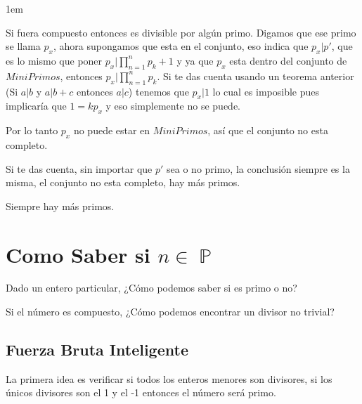 \documentclass[12pt]{report}                                    %
\newenvironment{SmallIndentation}[1][0.75em]                    %
    {\begin{adjustwidth}{#1}{}\begin{footnotesize}}                 %
    {\end{footnotesize}\end{adjustwidth}}                           %
\DeclareMathOperator \Naturals  {\mathbb{N}}                     %
\DeclareMathOperator \Primes    {\mathbb{P}}                     %
\begin{document}
\begin{itemize}
\begin{SmallIndentation}[1em]
                    Si fuera compuesto entonces es divisible por algún primo.
                    Digamos que ese primo se llama $p_x$, ahora supongamos que 
                    esta en el conjunto, eso indica que $p_x|p'$, que es lo
                    mismo que poner $p_x|\prod_{n=1}^{n}p_k+1$ y ya que $p_x$ 
                    esta dentro del conjunto de $MiniPrimos$, entonces
                    $p_x|\prod_{n=1}^{n}p_k$. Si te das cuenta usando un teorema anterior
                    (Si $a|b$ y $a|b+c$ entonces $a|c$) tenemos que $p_x|1$ lo cual es
                    imposible pues implicaría que $1 = kp_x$ y eso simplemente no se puede.

                    Por lo tanto $p_x$ no puede estar en $MiniPrimos$, así que el conjunto
                    no esta completo.

                    Si te das cuenta, sin importar que $p'$ sea o no primo, la conclusión
                    siempre es la misma, el conjunto no esta completo, hay más primos.

                    Siempre hay más primos.

                \end{SmallIndentation}

        \end{itemize}





    \clearpage
    \section{Como Saber si $n \in \Primes$}
    
        Dado un entero particular, ¿Cómo podemos saber si es primo o no?

        Si el número es compuesto, ¿Cómo podemos encontrar un divisor no trivial?


        \subsection{Fuerza Bruta Inteligente}

            La primera idea es verificar si todos los enteros menores son
            divisores, si los únicos divisores son el 1 y el -1 entonces
            el número será primo.
\end{document}
